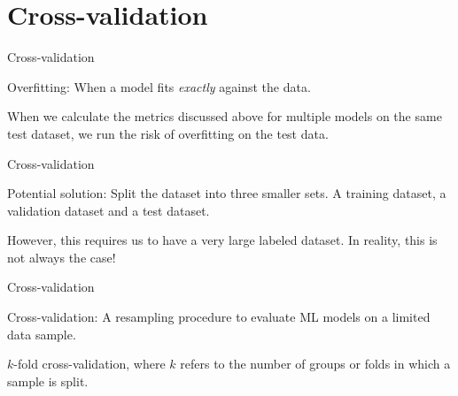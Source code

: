 \documentclass[handout]{beamer}
\begin{document}
\section{Cross-validation}

\begin{frame}{Cross-validation}
	
	Overfitting: When a model fits \emph{exactly} against the data.
	
	When we calculate the metrics discussed above for multiple models on the same test dataset, we run the risk of overfitting on the test data.
	
	
	
\end{frame}


\begin{frame}{Cross-validation}
	
	Potential solution: Split the dataset into three smaller sets. A training dataset, a validation dataset and a test dataset.
	
	However, this requires us to have a very large labeled dataset. In reality, this is not always the case!
	
\end{frame}


\begin{frame}{Cross-validation}
	
	Cross-validation: A resampling procedure to evaluate ML models on a limited data sample.
	
	\(k\)-fold cross-validation, where \(k\) refers to the number of groups or folds in which a sample is split.

\end{frame}
\end{document}
